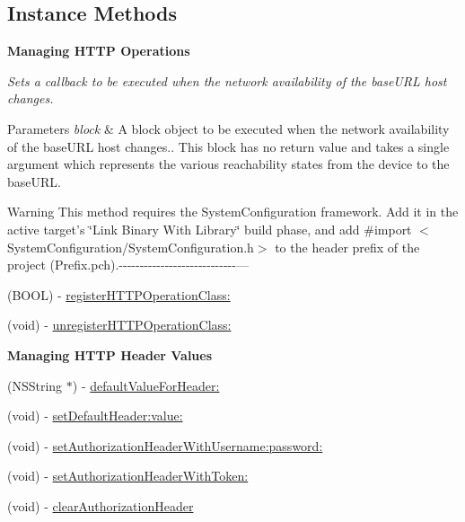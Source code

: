 \subsection*{Instance Methods}
\begin{Indent}{\bf Managing H\-T\-T\-P Operations}\par
{\em Sets a callback to be executed when the network availability of the {\ttfamily base\-U\-R\-L} host changes.


\begin{DoxyParams}{Parameters}
{\em block} & A block object to be executed when the network availability of the {\ttfamily base\-U\-R\-L} host changes.. This block has no return value and takes a single argument which represents the various reachability states from the device to the {\ttfamily base\-U\-R\-L}.\\
\hline
\end{DoxyParams}
\begin{DoxyWarning}{Warning}
This method requires the {\ttfamily System\-Configuration} framework. Add it in the active target's \char`\"{}\-Link Binary With Library\char`\"{} build phase, and add {\ttfamily \#import $<$System\-Configuration/\-System\-Configuration.\-h$>$} to the header prefix of the project ({\ttfamily Prefix.\-pch}).-\/-\/-\/-\/-\/-\/-\/-\/-\/-\/-\/-\/-\/-\/-\/-\/-\/-\/-\/-\/-\/-\/-\/-\/-\/-\/-\/-\/--- 

 
\end{DoxyWarning}
}\begin{DoxyCompactItemize}
\item 
(B\-O\-O\-L) -\/ \hyperlink{interface_a_f_h_t_t_p_client_a526af9c644f5b52ff4466e86ba735a67}{register\-H\-T\-T\-P\-Operation\-Class\-:}
\item 
(void) -\/ \hyperlink{interface_a_f_h_t_t_p_client_a2807a7c60e79b87008edc7543423729c}{unregister\-H\-T\-T\-P\-Operation\-Class\-:}
\end{DoxyCompactItemize}
\end{Indent}
\begin{Indent}{\bf Managing H\-T\-T\-P Header Values}\par
{\em 

 

 }\begin{DoxyCompactItemize}
\item 
(N\-S\-String $\ast$) -\/ \hyperlink{interface_a_f_h_t_t_p_client_afd596d06d5f3c1fa1e257f1b8f852f88}{default\-Value\-For\-Header\-:}
\item 
(void) -\/ \hyperlink{interface_a_f_h_t_t_p_client_a6403fa104936b8d8e4caa39f48210bc3}{set\-Default\-Header\-:value\-:}
\item 
(void) -\/ \hyperlink{interface_a_f_h_t_t_p_client_ad3e1972bc4b591e9341edccc124053ba}{set\-Authorization\-Header\-With\-Username\-:password\-:}
\item 
(void) -\/ \hyperlink{interface_a_f_h_t_t_p_client_a30e898cb9969298a697f8e5e2dc385c8}{set\-Authorization\-Header\-With\-Token\-:}
\item 
(void) -\/ \hyperlink{interface_a_f_h_t_t_p_client_ac2fbe84b1f891c8bff87cba444efd68a}{clear\-Authorization\-Header}
\end{DoxyCompactItemize}
\end{Indent}
